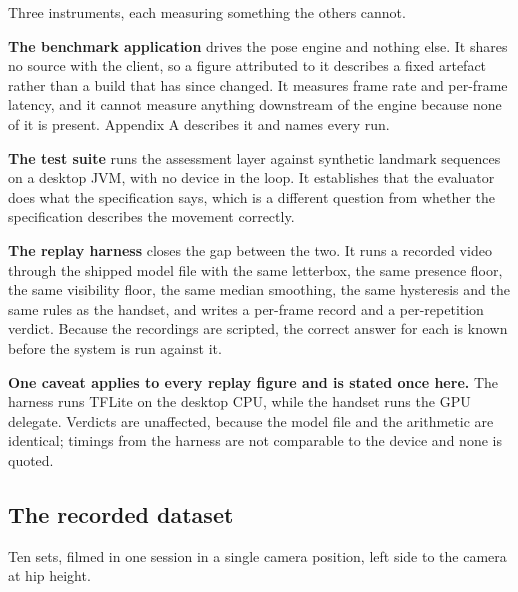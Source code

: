 Three instruments, each measuring something the others cannot.

\textbf{The benchmark application} drives the pose engine and nothing else. It shares no source with the client, so a figure attributed to it describes a fixed artefact rather than a build that has since changed. It measures frame rate and per-frame latency, and it cannot measure anything downstream of the engine because none of it is present. Appendix A describes it and names every run.

\textbf{The test suite} runs the assessment layer against synthetic landmark sequences on a desktop JVM, with no device in the loop. It establishes that the evaluator does what the specification says, which is a different question from whether the specification describes the movement correctly.

\textbf{The replay harness} closes the gap between the two. It runs a recorded video through the shipped model file with the same letterbox, the same presence floor, the same visibility floor, the same median smoothing, the same hysteresis and the same rules as the handset, and writes a per-frame record and a per-repetition verdict. Because the recordings are scripted, the correct answer for each is known before the system is run against it.

\textbf{One caveat applies to every replay figure and is stated once here.} The harness runs TFLite on the desktop CPU, while the handset runs the GPU delegate. Verdicts are unaffected, because the model file and the arithmetic are identical; timings from the harness are not comparable to the device and none is quoted.

\subsection{The recorded dataset}
\label{sec:9.3.1}

Ten sets, filmed in one session in a single camera position, left side to the camera at hip height.

